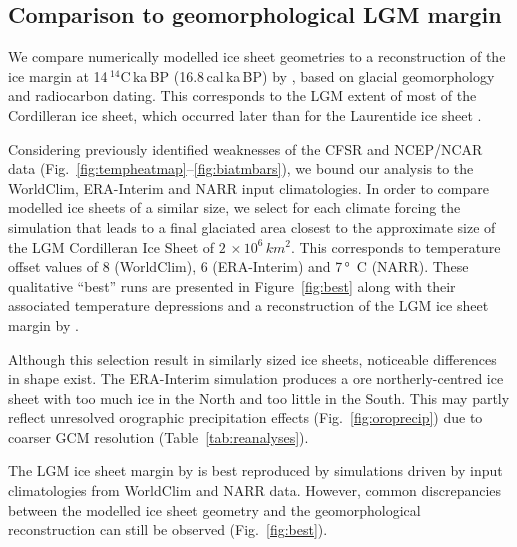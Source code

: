 \subsection{Comparison to geomorphological LGM margin}

We compare numerically modelled ice sheet geometries to a reconstruction of the ice margin at 14\,$^{14}$C\,ka\,BP (16.8\,cal\,ka\,BP) by \citet{dyke-2004}, based on glacial geomorphology and radiocarbon dating. This corresponds to the LGM extent of most of the Cordilleran ice sheet, which occurred later than for the Laurentide ice sheet \citep{porter-swanson-1998,dyke-2004,stroeven-etal-2010}.

Considering previously identified weaknesses of the CFSR and NCEP/NCAR data (Fig.~\ref{fig:tempheatmap}--\ref{fig:biatmbars}), we bound our analysis to the  WorldClim, ERA-Interim and NARR input climatologies. In order to compare modelled ice sheets of a similar size, we select for each climate forcing the simulation that leads to a final glaciated area closest to the approximate size of the LGM Cordilleran Ice Sheet of $2\,\times10^6\,\unit{km^2}$. This corresponds to temperature offset values of 8 (WorldClim), 6 (ERA-Interim) and 7\,\unit{\degree C} (NARR). These qualitative “best” runs are presented in Figure~\ref{fig:best} along with their associated temperature depressions and a reconstruction of the LGM ice sheet margin by \citet{dyke-2004}.

Although this selection result in similarly sized ice sheets, noticeable differences in shape exist. The ERA-Interim simulation produces a ore northerly-centred ice sheet with too much ice in the North and too little in the South. This may partly reflect unresolved orographic precipitation effects (Fig.~\ref{fig:oroprecip}) due to coarser GCM resolution (Table~\ref{tab:reanalyses}).

The LGM ice sheet margin by \citet{dyke-2004} is best reproduced by simulations driven by input climatologies from WorldClim and NARR data. However, common discrepancies between the modelled ice sheet geometry and the geomorphological reconstruction can still be observed (Fig.~\ref{fig:best}).

